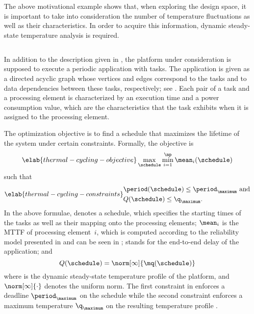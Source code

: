 The above motivational example shows that, when exploring the design space, it
is important to take into consideration the number of temperature fluctuations
as well as their characteristics. In order to acquire this information, dynamic
steady-state temperature analysis is required.

\subsection{\problemtitle}

In addition to the description given in , the platform under
consideration is supposed to execute a periodic application with \nt tasks. The
application is given as a directed acyclic graph whose vertices and edges
correspond to the tasks and to data dependencies between these tasks,
respectively; see . Each pair of a task and a
processing element is characterized by an execution time and a power consumption
value, which are the characteristics that the task exhibits when it is assigned
to the processing element.

The optimization objective is to find a schedule that maximizes the lifetime of
the system under certain constraints. Formally, the objective is
\begin{equation} \elab{thermal-cycling-objective}
  \max_{\schedule} \min_{i = 1}^\np \mean_i(\schedule)
\end{equation}
such that
\begin{align} \elab{thermal-cycling-constraints}
  \begin{split}
    & \period(\schedule) \leq \period_\maximum \text{ and} \\
    & Q(\schedule) \leq \q_\maximum.
  \end{split}
\end{align}
In the above formulae, \schedule denotes a schedule, which specifies the
starting times of the tasks as well as their mapping onto the processing
elements; $\mean_i$ is the \ac{MTTF} of processing element~$i$, which is
computed according to the reliability model presented in
 and can be seen in
; \period stands for the end-to-end delay of the
application; and
\[
  Q(\schedule) = \norm[\infty]{\mq(\schedule)}
\]
where \mq is the dynamic steady-state temperature profile of the platform, and
$\norm[\infty]{\cdot}$ denotes the uniform norm. The first constraint in
 enforces a deadline $\period_\maximum$ on the
schedule while the second constraint enforces a maximum temperature
$\q_\maximum$ on the resulting temperature profile \mq.


